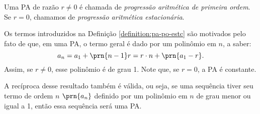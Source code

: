 \begin{definition}
\label{definition:pa-po-estc}
Uma PA de razão $r \ne 0$ é chamada de \emph{progressão aritmética de primeira ordem}. Se $r=0$, chamamos de \emph{progressão aritmética estacionária}.
\end{definition}

\begin{remark}
Os termos introduzidos na Definição \ref{definition:pa-po-estc} são motivados pelo fato de que, em uma PA, o termo geral é dado por um polinômio em $n$, a saber:
%
\begin{equation*}
a_n = a_1 + \prn{n-1} r = r \cdot n + \prn{a_1 - r}.
\end{equation*}
%
\noindent Assim, se $r\ne 0$, esse polinômio é de grau 1. Note que, se $r=0$, a PA é constante.

A recíproca desse resultado também é válida, ou seja, se uma sequência tiver seu termo de ordem $n$ $\prn{a_n}$ definido por um
polinômio em $n$ de grau menor ou igual a 1, então essa sequência será uma PA.
\end{remark}